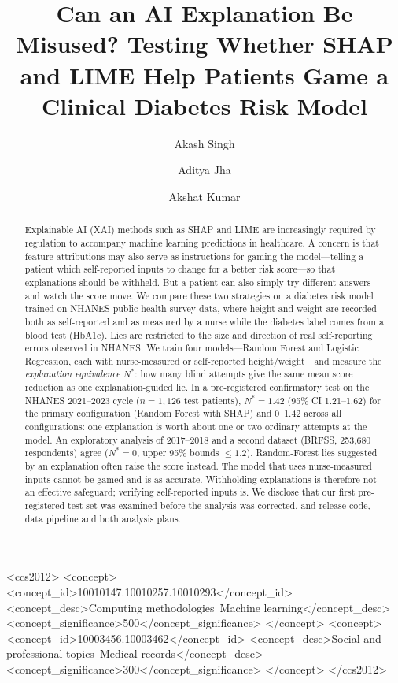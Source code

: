 \documentclass[sigconf,nonacm]{acmart}
\title{Can an AI Explanation Be Misused? Testing Whether SHAP and LIME
       Help Patients Game a Clinical Diabetes Risk Model}
\author{Akash Singh}
\affiliation{%
  \institution{Delhi Technological University}
  \city{Delhi}
  \country{India}
}
\author{Aditya Jha}
\affiliation{%
  \institution{Delhi Technological University}
  \city{Delhi}
  \country{India}
}
\author{Akshat Kumar}
\affiliation{%
  \institution{Delhi Technological University}
  \city{Delhi}
  \country{India}
}
\begin{document}
\begin{abstract}
Explainable AI (XAI) methods such as SHAP and LIME are increasingly
required by regulation to accompany machine learning predictions in
healthcare. A concern is that feature attributions may also serve as
instructions for gaming the model---telling a patient which
self-reported inputs to change for a better risk score---so that
explanations should be withheld. But a patient can also simply try
different answers and watch the score move. We compare these two
strategies on a diabetes risk model trained on NHANES public health
survey data, where height and weight are recorded both as
self-reported and as measured by a nurse while the diabetes label
comes from a blood test (HbA1c). Lies are restricted to the size and
direction of real self-reporting errors observed in NHANES. We train
four models---Random Forest and Logistic Regression, each with
nurse-measured or self-reported height/weight---and measure the
\emph{explanation equivalence} $N^*$: how many blind attempts give the
same mean score reduction as one explanation-guided lie. In a
pre-registered confirmatory test on the NHANES 2021--2023 cycle
($n=1{,}126$ test patients), $N^* = 1.42$ (95\% CI 1.21--1.62) for the
primary configuration (Random Forest with SHAP) and 0--1.42 across all
configurations: one explanation is worth about one or two ordinary
attempts at the model.  An exploratory analysis of 2017--2018 and a
second dataset (BRFSS, 253{,}680 respondents) agree ($N^* = 0$, upper
95\% bounds $\le 1.2$).
Random-Forest lies suggested by an explanation often raise the score
instead.  The model that uses nurse-measured inputs cannot be gamed and
is as accurate.  Withholding explanations is therefore not an effective
safeguard; verifying self-reported inputs is.  We disclose that our
first pre-registered test set was examined before the analysis was
corrected, and release code, data pipeline and both analysis plans.
\end{abstract}

\begin{CCSXML}
<ccs2012>
  <concept>
    <concept_id>10010147.10010257.10010293</concept_id>
    <concept_desc>Computing methodologies~Machine learning</concept_desc>
    <concept_significance>500</concept_significance>
  </concept>
  <concept>
    <concept_id>10003456.10003462</concept_id>
    <concept_desc>Social and professional topics~Medical records</concept_desc>
    <concept_significance>300</concept_significance>
  </concept>
</ccs2012>
\end{CCSXML}
\end{document}
